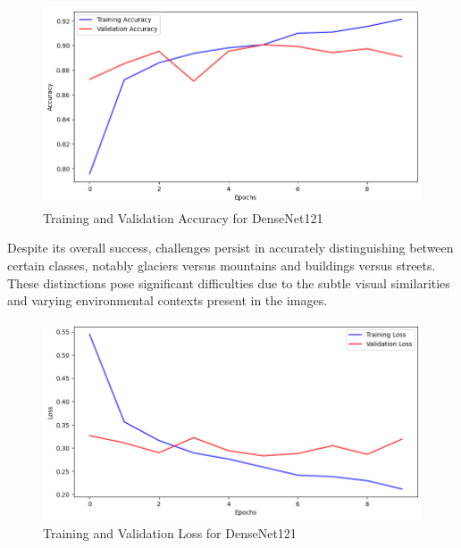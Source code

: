 \documentclass[conference]{IEEEtran}
\begin{document}
\begin{figure}[H]
    \centering
    \includegraphics[width=1\linewidth]{images//DenseNet/TrainingValidationAccuracyDensenet.png}
    \caption{Training and Validation Accuracy for DenseNet121}
    \label{fig:TV_Accuracy_DenseNet}
\end{figure}

Despite its overall success, challenges persist in accurately distinguishing between certain classes, notably glaciers versus mountains and buildings versus streets. These distinctions pose significant difficulties due to the subtle visual similarities and varying environmental contexts present in the images.

\begin{figure}[H]
    \centering
    \includegraphics[width=1\linewidth]{images//DenseNet/TrainingValidationLossDenseNet.png}
    \caption{Training and Validation Loss for DenseNet121}
    \label{fig:TV_Accuracy_DenseNet}
\end{figure}
\end{document}
